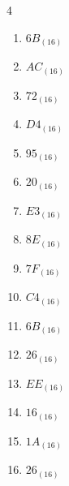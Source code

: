 \begin{multicols}{4}
\begin{enumerate}
  \item $6B_{(16)}$

        \phantom{$=107$}

  \item $AC_{(16)}$

        \phantom{$=172$}

  \item $72_{(16)}$

        \phantom{$=114$}

  \item $D4_{(16)}$

        \phantom{$=212$}

  \item $95_{(16)}$

        \phantom{$=149$}

  \item $20_{(16)}$

        \phantom{$=32$}

  \item $E3_{(16)}$

        \phantom{$=227$}

  \item $8E_{(16)}$

        \phantom{$=142$}

\columnbreak %

  \item $7F_{(16)}$

        \phantom{$=127$}

  \item $C4_{(16)}$

        \phantom{$=196$}

  \item $6B_{(16)}$

        \phantom{$=107$}

  \item $26_{(16)}$

        \phantom{$=38$}

  \item $EE_{(16)}$

        \phantom{$=238$}

  \item $16_{(16)}$

        \phantom{$=22$}

  \item $1A_{(16)}$

        \phantom{$=26$}

  \item $26_{(16)}$


\end{enumerate}
\end{multicols}
